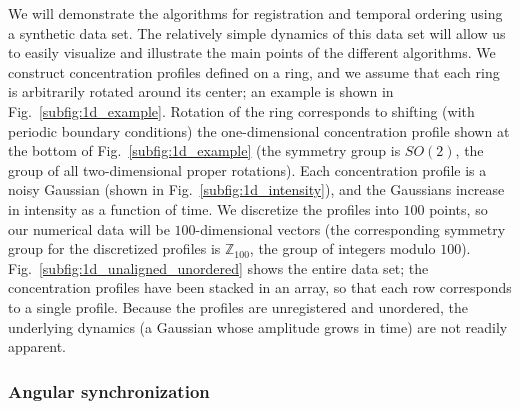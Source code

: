 \documentclass{pnastwo}
\newcommand{\fig}[0]{Fig.}
\begin{document}
\begin{article}
We will demonstrate the algorithms for registration and temporal ordering using a synthetic data set.
%
The relatively simple dynamics of this data set will allow us to easily visualize and illustrate the main points of the different algorithms.
%
We construct concentration profiles defined on a ring, and we assume that each ring is arbitrarily rotated around its center; an example is shown in \fig~\ref{subfig:1d_example}.
%
Rotation of the ring corresponds to shifting (with periodic boundary conditions) the one-dimensional concentration profile shown at the bottom of \fig~\ref{subfig:1d_example} (the symmetry group is $SO(2)$, the group of all two-dimensional proper rotations).
%
Each concentration profile is a noisy Gaussian (shown in \fig~\ref{subfig:1d_intensity}), and the Gaussians increase in intensity as  a function of time.
%
We discretize the profiles into $100$ points, so our numerical data will be $100$-dimensional vectors (the corresponding symmetry group for the discretized profiles is $\mathbb{Z}_{100}$, the group of integers modulo $100$).
%
\fig~\ref{subfig:1d_unaligned_unordered} shows the entire data set; the concentration profiles have been stacked in an array, so that each row corresponds to a single profile.
%
Because the profiles are unregistered and unordered, the underlying dynamics (a Gaussian whose amplitude grows in time) are not readily apparent.



\subsubsection{Angular synchronization \cite{singer2011angular}}


\end{article}
\end{document}
